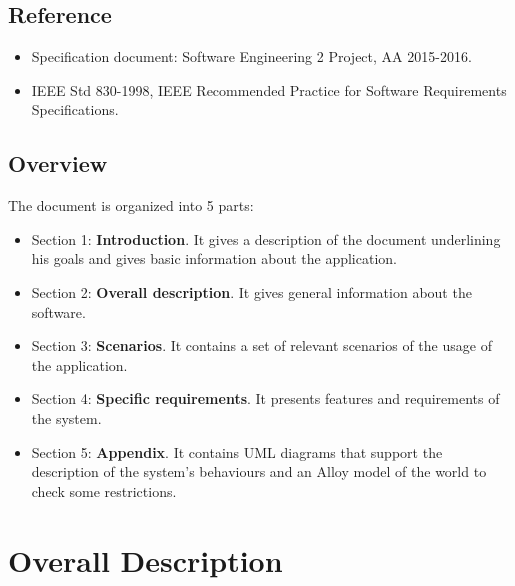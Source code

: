 \documentclass{article}
\begin{document}
\subsection{Reference}
\begin{itemize}
\item Specification document: Software Engineering 2 Project, AA 2015-2016.
\item IEEE Std 830-1998, IEEE Recommended Practice for Software Requirements Specifications.
\end{itemize}

\subsection{Overview}
The document is organized into 5 parts:
\begin{itemize}
\item Section 1: \textbf{Introduction}. It gives a description of the document underlining his goals and gives basic information about the application.
\item Section 2: \textbf{Overall description}. It gives general information about the software.
\item Section 3: \textbf{Scenarios}. It contains a set of relevant scenarios of the usage of the application.
\item Section 4: \textbf{Specific requirements}. It presents features and requirements of the system.
\item Section 5: \textbf{Appendix}. It contains UML diagrams that support the description of the system's behaviours and an Alloy model of the world to check some restrictions.
\end{itemize}

\section{Overall Description}
\end{document}
